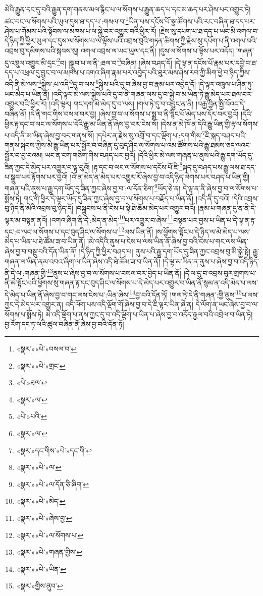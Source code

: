 མེའི་རྒྱུན་དང་དུ་བའི་རྒྱུན་དག་གནས་མལ་རྙིང་པ་ལ་སོགས་པ་རྒྱུན་ཆད་པ་དང་མ་ཆད་པར་ཤེས་པར་འགྱུར་ཏེ། ཚང་བང་ལ་སོགས་པའི་ཡུལ་དུས་ཐ་དད་པ་:གསལ་བ་\footnote{«སྣར་»«པེ་»བསལ་བ་}ཡིན་པས་དངོས་པོ་སྣ་ཚོགས་པའི་རང་བཞིན་ཐ་དད་པར་ཤེས་པ་གོམས་པའི་སྟོབས་ལ་མཁས་པ་ལ་སྐྱེ་བར་འགྱུར་བའི་ཕྱིར་རོ། །རྗེས་སུ་དཔག་པ་ཐ་དད་པ་ཡང་མི་འགལ་བ་དེ་ཉིད་ཀྱི་ཕྱིར་ཡུལ་དང་དུས་ལ་སོགས་པ་ལ་ལྟོས་པའི་འབྲས་བུའི་གཏན་ཚིགས་ཀྱི་རྗེས་སུ་དཔོག་པ་ནི་འགལ་བའི་འབྲས་བུ་དམིགས་པའི་སྐབས་སུ། འགལ་འབྲས་ལ་ཡང་ཡུལ་དང་ནི། །དུས་ལ་སོགས་པ་ལྟོས་པར་འདོད། །གཞན་དུ་འཁྲུལ་འགྱུར་མི་དྲང་\footnote{«སྣར་»«པེ་»གྲང་}བ། །སྒྲུབ་པ་ལ་ནི་:ཐལ་བ་\footnote{«པེ་»ཐལ་}བཞིན། །ཞེས་བཤད་དོ། །དེ་ལྟ་ན་དངོས་པོ་རྣམ་པར་དབྱེ་བ་ཐ་དད་པ་འཕྲལ་དུ་བྱུང་བ་ལ་མཁས་པ་འགའ་ཞིག་རྣམ་པར་འབྱེད་པའི་ཐུར་མས་ཤེས་རབ་ཀྱི་མིག་ཕྱེ་བ་ཉིད་ཀྱིས་འདི་ནི་མེ་ལས་\footnote{«སྣར་»ལ་}སྐྱེས་:པ་འདི་\footnote{«པེ་»པའི་}དུ་བ་ལས་\footnote{«སྣར་»ལ་}སྐྱེས་པའི་དུ་བ་ཞེས་བྱ་བ་རྣམ་པར་འབྱེད་དོ། །དེ་ལྟར་འཁྲུལ་པ་ཤིན་ཏུ་ཡང་མེད་པ་ཡིན་ནོ། །འདི་ལྟར་མེ་ལས་སྐྱེས་པའི་དུ་བ་ནི་གཞན་ལས་དུ་བ་སྐྱེ་བ་མ་ཡིན་ཏེ་རྒྱུ་མེད་པར་ཐལ་བར་འགྱུར་བའི་ཕྱིར་རོ། །འདི་ལྟར། གང་དག་མེ་མེད་དུ་བ་ལས། །གལ་ཏེ་དུ་བ་འབྱུང་ན་ནི། །བརྒྱ་བྱིན་སྤྱི་བོའང་དེ་བཞིན་ནོ། །དེ་ནི་གང་གིས་བསལ་བར་བྱ། །ཞེས་བྱ་བ་ལ་སོགས་པ་སྨྲ་བ་ནི་སྙིང་པོ་མེད་པས་དོར་བར་བྱའོ། །དེའི་ཕྱིར་རྟ་དང་བ་ལང་ལ་སོགས་པ་དེའི་རྒྱུ་མ་ཡིན་ནོ་ཞེས་བྱ་བར་ངེས་སོ། །དེས་ན་མེ་ཁོ་ན་དེའི་རྒྱུ་ཡིན་གྱི་རྟ་ལ་སོགས་པ་འདི་ནི་མ་ཡིན་ཞེས་བྱ་བར་གནས་སོ། །དཔེར་ན་རྗེས་སུ་འགྲོ་བ་དང་ལྡོག་པ་:དག་གིས་\footnote{«སྣར་»དང་གིས་«པེ་»དང་གི་}ཇི་སྐད་བཤད་པའི་གནས་སྐབས་ཀྱིས་མེ་རྒྱུ་ཡིན་པར་སྦྱོར་བ་བཞིན་དུ་བུད་ཤིང་ལ་སོགས་པ་འམ་ཚོགས་པའི་རྒྱུ་ཐམས་ཅད་ལའང་སྦྱོར་བ་བྱ་བའམ། ཡང་ན་ངག་གཅིག་གིས་བཤད་པར་བྱའོ། །དེའི་ཕྱིར་མེ་ལས་གཞན་པ་ནུས་པའི་རྒྱུ་དག་ཡོད་དུ་ཟིན་ཀྱང་དེ་མེད་པར་འགྱུར་བ་ལྟ་བུའོ། །རྟ་དང་བ་ལང་ལ་སོགས་པ་དངོས་པོ་ཇི་\footnote{«སྣར་»«པེ་»ལ་}སྐད་དུ་བཤད་པས་རྒྱུ་ལས་ཐ་དད་པ་སྒྲུབ་པར་རྟོགས་པར་བྱའོ། །འོ་ན་མེད་ན་མེད་པར་འགྱུར་རོ་ཞེས་བྱ་བ་འདི་ཉིད་ལེགས་པར་བཤད་པ་ཡིན་གྱི། གཞན་པའི་ནུས་པ་རྒྱུ་དག་ཡོད་དུ་ཟིན་ཀྱང་ཞེས་བྱ་བ་:ལ་དོན་ཅིག་\footnote{«སྣར་»«པེ་»ལ་དོན་ཅི་ཞིག་}ཡོད་ཅེ་ན། དེ་ལྟ་ན་ནི་ཞེས་བྱ་བ་ལ་སོགས་པ་སྨོས་ཏེ། གང་གི་ཕྱིར་དེ་ལྟར་ཡོད་དུ་ཟིན་ཀྱང་ཞེས་བྱ་བ་ལ་སོགས་པ་བརྗོད་པ་ཡིན་ནོ། །འདི་ནི་དུ་བའོ། །དེའི་འབྲས་བུ་ཉིད་ནི་མེའི་འབྲས་བུ་ཉིད་དོ། །བསྒྲུབས་པ་ནི་ངེས་པ་སྟེ་ཐེ་ཆོམ་མེད་པར་འགྱུར་བའོ། །རྣམ་པ་གཞན་དུ་ན་ནི་དེ་ལྟར་མ་བསྟན་ནའོ། །འགའ་ཞིག་ནི་དེ་:མེད་ན་མེད་\footnote{«སྣར་»«པེ་»མེད་}པར་འགྱུར་བ་ཞེས་\footnote{«སྣར་»«པེ་»ཞེས་བྱ་}བསྟན་པར་བྱས་པ་ཡིན་པ་དེ་ལྟ་ན་རྟ་དང་:བ་ལང་ལ་སོགས་པ་དང་བུད་ཤིང་ལ་སོགས་པ་\footnote{«སྣར་»«པེ་»ལ་སོགས་པ་}ལས་ཡིན་ནོ། །ས་ཕྱོགས་སྟོང་པ་དེ་ཉིད་ལ་མེ་མེད་པ་ལས་མེད་པ་ཡིན་པ་ཐེ་ཚོམ་ཟ་བ་ཡིན་ནོ། །མེ་འདིའི་ནུས་པ་ངེས་པ་ལས་ཡིན་ནོ་ཞེས་བྱ་བའི་ངེས་པ་གང་ལས་ཡིན་ཞེས་བྱ་བ་བསྡུ་བའི་དོན་ཡིན་ནོ། །དེ་ཉིད་ཀྱི་ཕྱིར་བཤད་པ། ནུས་པའི་རྒྱུ་དག་ཡོད་དུ་ཟིན་ཀྱང་འབྲས་བུ་མི་སྐྱེ་སྟེ། རྒྱུ་གཞན་ལ་ཡིན་ནམ་འབའ་ཞིག་ལ་ཡིན་ཞེས་འདི་ཐེ་ཚོམ་ཟ་བ་ཡིན་ནོ། །དེ་ལྟ་མ་ཡིན་ན་ནུས་པ་ཞེས་བྱ་བ་འདི་ཉིད་ནི་དེ་ལ་:གཞན་གྱི་\footnote{«སྣར་»«པེ་»གཞན་གྱིས་}ནུས་པ་ཞེས་བྱ་བ་ལ་སོགས་པ་བསལ་བར་བྱེད་པ་ཡིན་ནོ། །དེ་ལ་དུ་བ་འབྲས་བུར་གྲགས་པ་ནི་མེ་སྟོང་པའི་ཕྱོགས་སུ་གཞན་རྟ་དང་བུད་ཤིང་ལ་སོགས་པ་དེ་མེད་པར་འགྱུར་བ་ཡིན་ནོ་སྙམ་ན་འདི་མེད་པ་ལས་དེ་མེད་པ་ཡིན་ནོ་ཞེས་བྱ་བ་གང་ལས་ངེས་པ་:ཡིན་ཞེས་\footnote{«སྣར་»«པེ་»ཡིན་}བྱ་བའི་དོན་ཏོ། །གལ་ཏེ་དེ་ནི་གཞན་:གྱི་ནུས་\footnote{«སྣར་»གྱིས་ནུབ་}པ་ལས་ཀྱང་དེ་མེད་པར་འགྱུར་ན། འདི་ལོག་པས་འདི་ལྡོག་གོ་ཞེས་བྱ་བ་དེ་ཇི་ལྟར་ཡིན་ཞེ་ན། དེ་ལོག་ན་ཡང་ཞེས་བྱ་བ་ལ་སོགས་པ་སྨོས་ཏེ། མེ་འདི་ལྡོག་པ་ནས་ཀྱང་དུ་བ་འདི་ལྡོག་པ་ཡིན་པ་ཞེས་བྱ་བ་འདོད་རྒྱལ་བའི་འབྲེལ་བ་ཡིན་ཏེ། བྱ་རོག་དང་ཏ་ལའི་ཚུལ་བཞིན་ནོ་ཞེས་བྱ་བའི་དོན་ཏོ། 